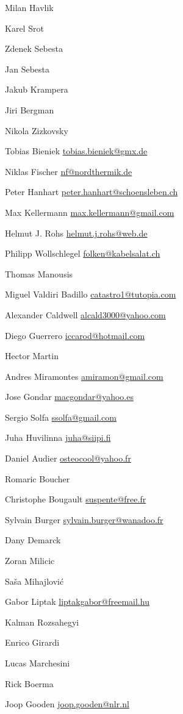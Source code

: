 \item Milan Havlik
\item Karel Srot
\item*Zdenek Sebesta
\item*Jan Sebesta
\item*Jakub Krampera
\item*Jiri Bergman
\item*Nikola Zizkovsky
\item Tobias Bieniek \url{tobias.bieniek@gmx.de}
\item Niklas Fischer \url{nf@nordthermik.de}
\item Peter Hanhart \url{peter.hanhart@schoensleben.ch}
\item Max Kellermann \url{max.kellermann@gmail.com}
\item Helmut J. Rohs \url{helmut.j.rohs@web.de}
\item Philipp Wollschlegel \url{folken@kabelsalat.ch}
\item*Thomas Manousis
\item Miguel Valdiri Badillo \url{catastro1@tutopia.com}
\item Alexander Caldwell \url{alcald3000@yahoo.com}
\item Diego Guerrero \url{iccarod@hotmail.com}
\item*Hector Martin
\item Andres Miramontes \url{amiramon@gmail.com}
\item Jose Gondar \url{macgondar@yahoo.es}
\item Sergio Solfa \url{ssolfa@gmail.com}
\item Juha Huvilinna \url{juha@siipi.fi}
\item Daniel Audier \url{osteocool@yahoo.fr}
\item*Romaric Boucher
\item Christophe Bougault \url{suspente@free.fr}
\item Sylvain Burger \url{sylvain.burger@wanadoo.fr}
\item*Dany Demarck
\item*Zoran Milicic
\item*Saša Mihajlović
\item Gabor Liptak \url{liptakgabor@freemail.hu}
\item*Kalman Rozsahegyi
\item*Enrico Girardi
\item*Lucas Marchesini
\item*Rick Boerma
\item Joop Gooden \url{joop.gooden@nlr.nl}

